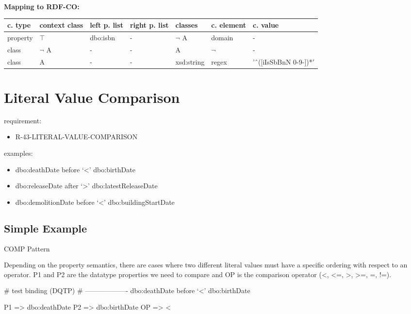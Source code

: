\documentclass{llncs}
\newenvironment{gcotable}{
  \scriptsize
  \sffamily
  \vspace{0cm}
	\begin{center}
	\textbf{\vspace{0.4cm}Mapping to RDF-CO:} \\
  \begin{tabular}{l|l|l|l|l|l|l}
	\hline
  \textbf{c. type} & \textbf{context class} & \textbf{left p. list} & \textbf{right p. list} & \textbf{classes} & \textbf{c. element} & \textbf{c. value} \\
  \hline

}{
  \hline
  \end{tabular}
	\end{center}
}
\begin{document}
\begin{gcotable}
property & $\top$ & dbo:isbn & - & $\neg$ A & domain & - \\
class & $\neg$ A & - & - & A & $\neg$ & - \\
class & A & - & - & xsd:string & regex & 'ˆ([iIsSbBnN 0-9-])*$' $ \\
\end{gcotable}

\section{Literal Value Comparison}

requirement:

\begin{itemize}
	\item R-43-LITERAL-VALUE-COMPARISON
\end{itemize}



examples:

\begin{itemize}
	\item dbo:deathDate before ‘<’ dbo:birthDate
  \item dbo:releaseDate after ‘>’ dbo:latestReleaseDate
  \item dbo:demolitionDate before ‘<’ dbo:buildingStartDate
\end{itemize}

\subsection{Simple Example}


COMP Pattern \cite{Kontokostas2014} 

Depending on the property semantics,
there are cases where two different literal values must have
a specific ordering with respect to an operator. 
P1 and P2 are the datatype properties we need to compare and 
OP is the comparison operator (\textless, \textless=, \textgreater, \textgreater=, =, !=). 

\begin{ex}
# test binding (DQTP)
# -------------------
dbo:deathDate before ‘<’ dbo:birthDate

P1 => dbo:deathDate
P2 => dbo:birthDate
OP => <
\end{ex}
\end{document}
